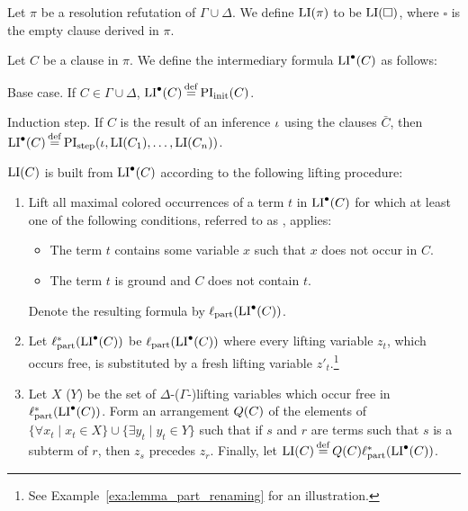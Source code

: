 \begin{defi}
	Let $\pi$ be a resolution refutation of $\Gamma \cup \Delta$.
	We define $\operatorname{LI}(\pi)$ to be $\operatorname{LI}(\square)$, where $\square$ is the empty clause derived in $\pi$.

	Let $C$ be a clause in $\pi$. 
	We define the intermediary formula $\operatorname{LI}^\bullet(C)$ as follows:
	\begin{description}
		\item{} Base case.
			If $C \in \Gamma\cup \Delta$, $\LIpre(C) \defeq \PIinit(C)$.

		\item{} Induction step.
			If $C$ is the result of an inference $\iota$ using the clauses $\bar C$, then $\LIpre(C) \defeq \PIstep(\inference, \LI(C_1), \dots, \LI(C_n))$.

	\end{description}

	\noindent
	$\operatorname{LI}(C)$ is built from $\operatorname{LI}^\bullet(C)$ according to the following lifting procedure:

	\begin{enumerate}
		\item Lift all maximal colored occurrences of a term $t$ in $\operatorname{LI}^\bullet(C)$ for which at least one of the following conditions, referred to as , applies:
			\begin{itemize} 
				\item The term $t$ contains some variable $x$ such that $x$ does not occur in\nolinebreak{} $C$.
				\item The term $t$ is ground and $C$ does not contain $t$.
			\end{itemize} 
			Denote the resulting formula by $\ell_\mathrm{part}(\operatorname{LI}^\bullet(C))$.

		\item 
Let $\ell_\mathrm{part}^*(\operatorname{LI}^\bullet(C))$ be 
$\ell_\mathrm{part}(\operatorname{LI}^\bullet(C))$  where every lifting variable $z_t$, which occurs free, is substituted by a fresh lifting variable $z'_{t}$.\footnote{See Example~\ref{exa:lemma_part_renaming} for an illustration.} 
\label{lemma_part_renaming}

		\item Let $X$ ($Y$) be the set of $\Delta$-($\Gamma$-)lifting variables which occur free in  
			$\ell_\mathrm{part}^*(\operatorname{LI}^\bullet(C))$.
			Form an arrangement $Q(C)$ of the elements of $\{\forall x_t \mid x_t \in X\}\cup\allowbreak\{\exists y_t \mid y_t \in Y\}$ such that if $s$ and $r$ are terms such that $s$ is a subterm of $r$, then $z_s$ precedes\nolinebreak{} $z_r$.
			Finally, let $\LI(C) \defeq Q(C) \lifpart^*(\LIpre(C))$.
			\qedhere
	\end{enumerate}
\end{defi}

